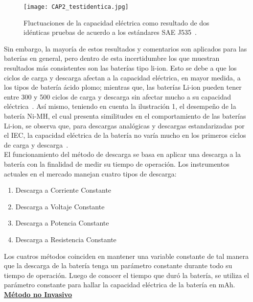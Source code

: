 \begin{figure}[htbp]
\begin{center}
\texttt{[image: CAP2\_testidentica.jpg]}
\caption{Fluctuaciones de la capacidad eléctrica como resultado de dos idénticas pruebas de acuerdo a los estándares SAE J535~\cite{Buchmann2011}.}
\label{fig:testidentica}
\end{center}
\end{figure}

Sin embargo, la mayoría de estos resultados y comentarios son aplicados para las baterías en general, pero dentro de esta incertidumbre los que muestran resultados más consistentes son las baterías tipo li-ion. Esto se debe a que los ciclos de carga y descarga afectan a la capacidad eléctrica, en mayor medida, a los tipos de batería ácido plomo; mientras que, las baterías Li-ion pueden tener entre 300 y 500 ciclos de carga y descarga sin afectar mucho a su capacidad eléctrica~\cite{capacityloss}. Así mismo, teniendo en cuenta la ilustración 1, el desempeño de la batería Ni-MH, el cual presenta similitudes en el comportamiento de las baterías Li-ion, se observa que, para descargas analógicas y descargas estandarizadas por el IEC, la capacidad eléctrica de la batería no varía mucho en los primeros ciclos de carga y descarga~\cite{Buchmann2011}. \\

El funcionamiento del método de descarga se basa en aplicar una descarga a la batería con la finalidad de medir su tiempo de operación. Los instrumentos actuales en el mercado manejan cuatro tipos de descarga:

\begin{enumerate}
\item Descarga a Corriente Constante
\item Descarga a Voltaje Constante
\item Descarga a Potencia Constante
\item Descarga a Resistencia Constante
\end{enumerate}

Los cuatros métodos coinciden en mantener una variable constante de tal manera que la descarga de la batería tenga un parámetro constante durante todo su tiempo de operación. Luego de conocer el tiempo que duró la batería, se utiliza el parámetro constante para hallar la capacidad eléctrica de la batería en mAh. \\

\textbf{\underline{Método no Invasivo}}

